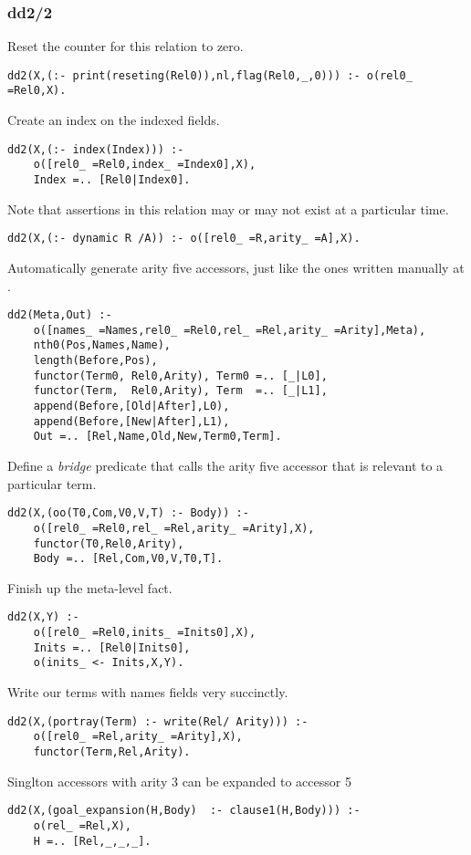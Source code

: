 \documentclass[twocolumn,10pt]{book}
\begin{document}
\subsubsection{ dd2/2
}
 Reset the counter for this relation to zero.  \begin{Verbatim}
dd2(X,(:- print(reseting(Rel0)),nl,flag(Rel0,_,0))) :- o(rel0_ =Rel0,X).
\end{Verbatim}
 Create an index on the indexed fields.  \begin{Verbatim}
dd2(X,(:- index(Index))) :-
    o([rel0_ =Rel0,index_ =Index0],X),
    Index =.. [Rel0|Index0].
\end{Verbatim}
 Note that assertions in this relation may or may not
exist at a particular time.  \begin{Verbatim}
dd2(X,(:- dynamic R /A)) :- o([rel0_ =R,arity_ =A],X).
\end{Verbatim}
 Automatically generate arity five accessors, just like
the ones written manually at .
\begin{Verbatim}
dd2(Meta,Out) :-
    o([names_ =Names,rel0_ =Rel0,rel_ =Rel,arity_ =Arity],Meta),
    nth0(Pos,Names,Name),
    length(Before,Pos),
    functor(Term0, Rel0,Arity), Term0 =.. [_|L0],
    functor(Term,  Rel0,Arity), Term  =.. [_|L1],
    append(Before,[Old|After],L0),
    append(Before,[New|After],L1),
    Out =.. [Rel,Name,Old,New,Term0,Term].
\end{Verbatim}
 Define a {\em bridge} predicate that calls the
arity five accessor that is relevant to a particular term.  \begin{Verbatim}
dd2(X,(oo(T0,Com,V0,V,T) :- Body)) :-
    o([rel0_ =Rel0,rel_ =Rel,arity_ =Arity],X),
    functor(T0,Rel0,Arity),
    Body =.. [Rel,Com,V0,V,T0,T].
\end{Verbatim}
 Finish up the meta-level fact.  \begin{Verbatim}
dd2(X,Y) :-
    o([rel0_ =Rel0,inits_ =Inits0],X),
    Inits =.. [Rel0|Inits0],
    o(inits_ <- Inits,X,Y).
\end{Verbatim}
 Write our terms with names fields very succinctly.  \begin{Verbatim}
dd2(X,(portray(Term) :- write(Rel/ Arity))) :-
    o([rel0_ =Rel,arity_ =Arity],X),
    functor(Term,Rel,Arity).
\end{Verbatim}
 Singlton accessors with arity 3 can be expanded to accessor 5   \begin{Verbatim}
dd2(X,(goal_expansion(H,Body)  :- clause1(H,Body))) :-
    o(rel_ =Rel,X),
    H =.. [Rel,_,_,_].
\end{Verbatim}
\end{document}
